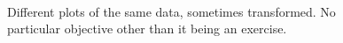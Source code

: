 \documentclass[10pt, fullpage, a4paper, titlepage]{article}
\begin{document}
\begin{figure}[h]
\begin{center}
{{		        }
		}\\ 	%
	\end{center}
	\caption{Different plots of the same data, sometimes transformed. No particular objective other than it being an exercise.}
	\label{Fig1}
\end{figure}
\end{document}
